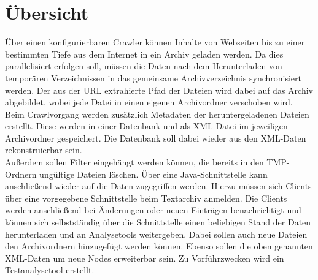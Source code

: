 \chapter{Übersicht}
Über einen konfigurierbaren Crawler können Inhalte von Webseiten bis zu einer bestimmten Tiefe
aus dem Internet in ein Archiv geladen werden. Da dies parallelisiert erfolgen soll,
müssen die Daten nach dem Herunterladen von temporären Verzeichnissen in das gemeinsame
Archivverzeichnis synchronisiert werden. Der aus der URL extrahierte Pfad der Dateien wird
dabei auf das Archiv abgebildet, wobei jede Datei in einen eigenen Archivordner verschoben wird.\\

Beim Crawlvorgang werden zusätzlich Metadaten der heruntergeladenen Dateien erstellt. 
Diese werden in einer Datenbank und als XML-Datei im jeweiligen Archivordner gespeichert.
Die Datenbank soll dabei wieder aus den XML-Daten rekonstruierbar sein. \\ 

Außerdem sollen Filter eingehängt werden können, die bereits in den TMP-Ordnern ungültige Dateien löschen.
Über eine Java-Schnittstelle kann anschließend wieder auf die Daten zugegriffen werden.
Hierzu müssen sich Clients über eine vorgegebene Schnittstelle beim Textarchiv anmelden.
Die Clients werden anschließend bei Änderungen oder neuen Einträgen benachrichtigt und können sich selbstständig über die Schnittstelle einen beliebigen Stand der Daten herunterladen und an Analysetools weitergeben.
Dabei sollen auch neue Dateien den Archivordnern hinzugefügt werden können.
Ebenso sollen die oben genannten XML-Daten um neue Nodes erweiterbar sein.
Zu Vorführzwecken wird ein Testanalysetool erstellt.


 
